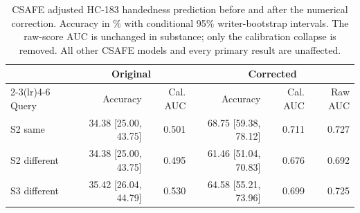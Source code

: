 \begin{table}[ht]
\caption{CSAFE adjusted HC-183 handedness prediction before and after the numerical correction. Accuracy in \% with conditional 95\% writer-bootstrap intervals. The raw-score AUC is unchanged in substance; only the calibration collapse is removed. All other CSAFE models and every primary result are unaffected.}\label{tab:correction}
\centering\footnotesize
\begin{tabular}{lrrrrr}\toprule
 & \multicolumn{2}{c}{Original} & \multicolumn{3}{c}{Corrected}\\\cmidrule(lr){2-3}\cmidrule(lr){4-6}
Query & Accuracy & Cal. AUC & Accuracy & Cal. AUC & Raw AUC\\\midrule
S2 same & 34.38 [25.00, 43.75] & 0.501 & 68.75 [59.38, 78.12] & 0.711 & 0.727 \\
S2 different & 34.38 [25.00, 43.75] & 0.495 & 61.46 [51.04, 70.83] & 0.676 & 0.692 \\
S3 different & 35.42 [26.04, 44.79] & 0.530 & 64.58 [55.21, 73.96] & 0.699 & 0.725 \\
\bottomrule
\end{tabular}
\end{table}
